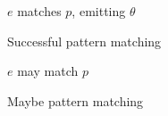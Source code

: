 
\begin{figure}[h]
{$e$ matches $p$, emitting $\theta$}

\begin{mathpar}





\end{mathpar}
\caption{Successful pattern matching}
\label{fig:succmatch}
\end{figure}

\begin{figure}[h]
{$e$ may match $p$}

\begin{mathpar}








\end{mathpar}
\caption{Maybe pattern matching}
\label{fig:maymatch}
\end{figure}

